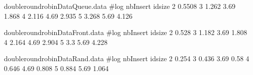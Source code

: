 
\begin{filecontents}{doubleroundrobinDataQueue.data}
#log nbInsert idsize  
2 0.5508
3 1.262
3.69 1.868
4 2.116
4.69 2.935
5 3.268
5.69 4.126
\end{filecontents}

\begin{filecontents}{doubleroundrobinDataFront.data}
#log nbInsert  idsize  
2 0.528
3 1.182
3.69 1.808
4 2.164
4.69 2.904
5 3.3
5.69 4.228
\end{filecontents}

\begin{filecontents}{doubleroundrobinDataRand.data}
#log nbInsert  idsize  
2 0.254
3 0.436
3.69 0.58
4 0.646
4.69 0.808
5 0.884
5.69 1.064
\end{filecontents}
